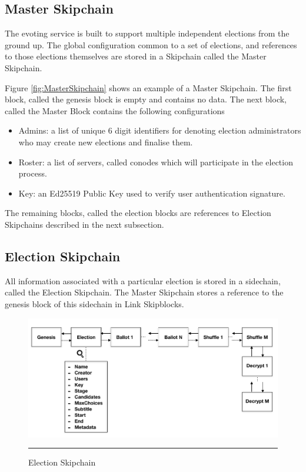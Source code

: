 \subsection{Master Skipchain}

The evoting service is built to support multiple independent elections from the ground up. The global configuration common to a set of elections, and references to those elections themselves are stored in a Skipchain called the Master Skipchain.

Figure \ref{fig:MasterSkipchain} shows an example of a Master Skipchain. The first block, called the genesis block is empty and contains no data. The next block, called the Master Block contains the following configurations

\begin{itemize}
\item Admins: a list of unique 6 digit identifiers for denoting election administrators who may create new elections and finalise them.
\item Roster: a list of servers, called conodes which will participate in the election process.
\item Key: an Ed25519 Public Key used to verify user authentication signature.
\end{itemize}

The remaining blocks, called the election blocks are references to Election Skipchains described in the next subsection.

\subsection{Election Skipchain}

All information associated with a particular election is stored in a sidechain, called the Election Skipchain. The Master Skipchain stores a reference to the genesis block of this sidechain in Link Skipblocks.

\begin{figure}[ht]
  \centering
    \includegraphics[scale=0.4]{Figures/ElectionSkipchain.png}
    \rule{35em}{0.5pt}
  \caption[Election Skipchain]{Election Skipchain}
  \label{fig:ElectionSkipchain}
\end{figure}

